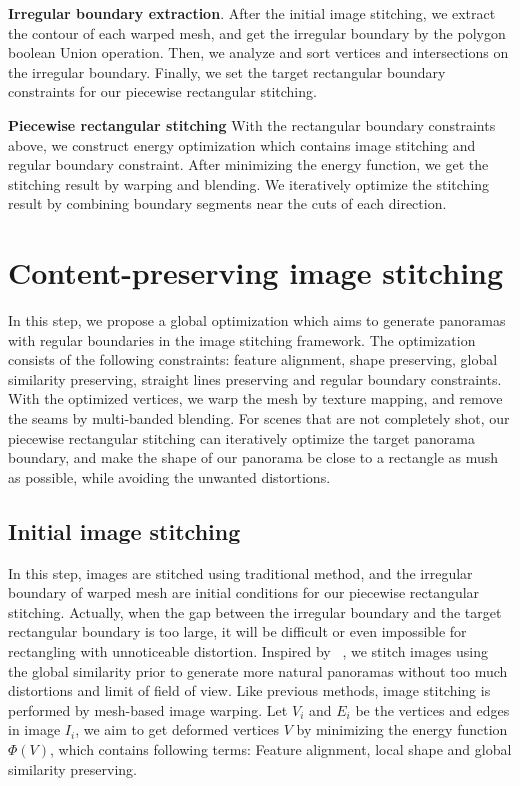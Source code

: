 \documentclass[10pt,journal,compsoc]{IEEEtran}
\begin{document}
\textbf{Irregular boundary extraction}.
After the initial image stitching, we extract the contour of each warped mesh, and get the irregular boundary by the polygon boolean Union operation.
Then, we analyze and sort vertices and intersections on the irregular boundary.
Finally, we set the target rectangular boundary constraints for our piecewise rectangular stitching.

 \textbf{Piecewise rectangular stitching}
With the rectangular boundary constraints above, we construct energy optimization which contains image stitching and regular boundary constraint.
After minimizing the energy function, we get the stitching result by warping and blending.
We iteratively optimize the stitching result by combining boundary segments near the cuts of each direction.

\section{Content-preserving image stitching}
 In this step, we propose a global optimization which aims to generate panoramas with regular boundaries in the image stitching framework.
 The optimization consists of the following constraints: feature alignment, shape preserving, global similarity preserving, straight lines preserving and regular boundary constraints.
With the optimized vertices, we warp the mesh by texture mapping, and remove the seams by multi-banded blending.
For scenes that are not completely shot, our piecewise rectangular stitching can iteratively optimize the target panorama boundary, and make the shape of our panorama be close to a rectangle as mush as possible, while avoiding the unwanted distortions.

 \subsection{Initial image stitching}
 \label{sec:Initial image stitching}
 In this step, images are stitched using traditional method, and the irregular boundary of warped mesh are initial conditions for our piecewise rectangular stitching.
 Actually, when the gap between the irregular boundary and the target rectangular boundary is too large, it will be difficult or even impossible for rectangling with unnoticeable distortion.
 Inspired by ~\cite{conf/eccv/ChenC16}, we stitch images using the global similarity prior to generate more natural panoramas without too much distortions and limit of field of view.
 Like previous methods, image stitching is performed by mesh-based image warping.
 Let $V_i$ and $E_i$ be the vertices and edges in image $I_i$, we aim to get deformed vertices $V$ by minimizing the energy function $\Phi(V)$, which contains following terms:
Feature alignment, local shape and global similarity preserving.
\end{document}
